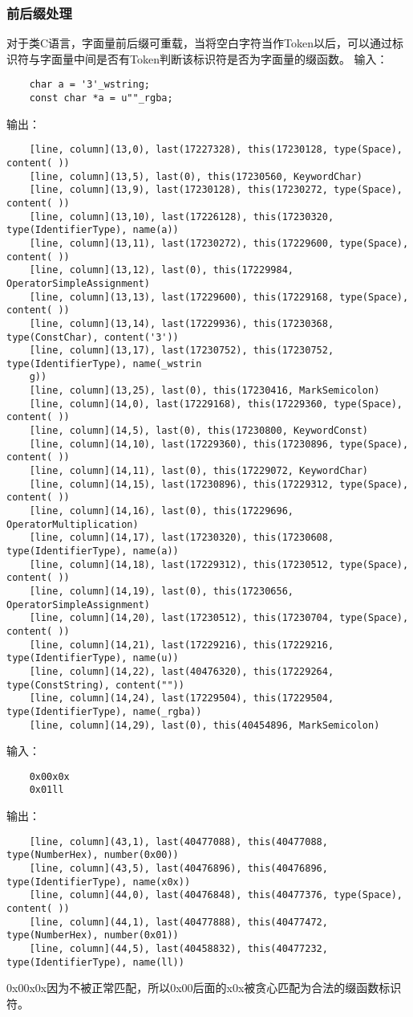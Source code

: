 \documentclass[UTF8]{ctexart}
\begin{document}
\subsubsection{前后缀处理}
对于类C语言，字面量前后缀可重载，当将空白字符当作Token以后，可以通过标识符与字面量中间是否有Token判断该标识符是否为字面量的缀函数。
输入：
{\firacode
\begin{lstlisting}
    char a = '3'_wstring;
    const char *a = u""_rgba;
\end{lstlisting}
}
输出：
{\firacode
\begin{lstlisting}
    [line, column](13,0), last(17227328), this(17230128, type(Space), content( ))
    [line, column](13,5), last(0), this(17230560, KeywordChar)
    [line, column](13,9), last(17230128), this(17230272, type(Space), content( ))
    [line, column](13,10), last(17226128), this(17230320, type(IdentifierType), name(a))
    [line, column](13,11), last(17230272), this(17229600, type(Space), content( ))
    [line, column](13,12), last(0), this(17229984, OperatorSimpleAssignment)
    [line, column](13,13), last(17229600), this(17229168, type(Space), content( ))
    [line, column](13,14), last(17229936), this(17230368, type(ConstChar), content('3'))
    [line, column](13,17), last(17230752), this(17230752, type(IdentifierType), name(_wstrin
    g))
    [line, column](13,25), last(0), this(17230416, MarkSemicolon)
    [line, column](14,0), last(17229168), this(17229360, type(Space), content( ))
    [line, column](14,5), last(0), this(17230800, KeywordConst)
    [line, column](14,10), last(17229360), this(17230896, type(Space), content( ))
    [line, column](14,11), last(0), this(17229072, KeywordChar)
    [line, column](14,15), last(17230896), this(17229312, type(Space), content( ))
    [line, column](14,16), last(0), this(17229696, OperatorMultiplication)
    [line, column](14,17), last(17230320), this(17230608, type(IdentifierType), name(a))
    [line, column](14,18), last(17229312), this(17230512, type(Space), content( ))
    [line, column](14,19), last(0), this(17230656, OperatorSimpleAssignment)
    [line, column](14,20), last(17230512), this(17230704, type(Space), content( ))
    [line, column](14,21), last(17229216), this(17229216, type(IdentifierType), name(u))
    [line, column](14,22), last(40476320), this(17229264, type(ConstString), content(""))
    [line, column](14,24), last(17229504), this(17229504, type(IdentifierType), name(_rgba))
    [line, column](14,29), last(0), this(40454896, MarkSemicolon)
\end{lstlisting}
}
输入：
{\firacode
\begin{lstlisting}
    0x00x0x
    0x01ll
\end{lstlisting}
}
输出：
{\firacode
\begin{lstlisting}
    [line, column](43,1), last(40477088), this(40477088, type(NumberHex), number(0x00))
    [line, column](43,5), last(40476896), this(40476896, type(IdentifierType), name(x0x))
    [line, column](44,0), last(40476848), this(40477376, type(Space), content( ))
    [line, column](44,1), last(40477888), this(40477472, type(NumberHex), number(0x01))
    [line, column](44,5), last(40458832), this(40477232, type(IdentifierType), name(ll))
\end{lstlisting}
}
0x00x0x因为不被正常匹配，所以0x00后面的x0x被贪心匹配为合法的缀函数标识符。
\end{document}
